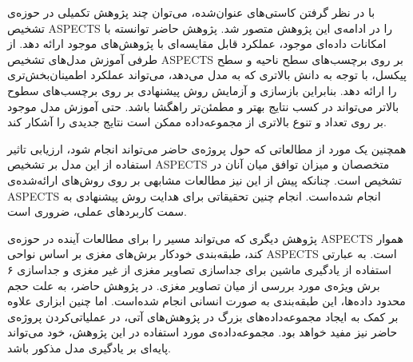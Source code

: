 
با در نظر گرفتن کاستی‌های عنوان‌شده، می‌توان چند پژوهش تکمیلی در حوزه‌ی تشخیص ASPECTS را در ادامه‌ی این پژوهش متصور شد.
پژوهش حاضر توانسته با امکانات داده‌ای موجود، عملکرد قابل مقایسه‌ای با پژوهش‌های موجود ارائه دهد.
از طرفی
آموزش مدل‌های تشخیص ASPECTS بر روی برچسب‌های سطح ناحیه و سطح پیکسل، با توجه به دانش بالاتری که به مدل می‌دهد، می‌تواند عملکرد اطمینان‌بخش‌تری را ارائه دهد.
بنابراین بازسازی و آزمایش روش پیشنهادی بر روی برچسب‌های سطوح بالاتر می‌تواند در کسب نتایج بهتر و مطمئن‌تر راهگشا باشد.
حتی آموزش مدل موجود بر روی تعداد و تنوع بالاتری از مجموعه‌داده ممکن است نتایج جدیدی را آشکار کند.

همچنین یک مورد از مطالعاتی که حول پروژه‌ی حاضر می‌تواند انجام شود، ارزیابی تاثیر استفاده از این مدل بر تشخیص ASPECTS متخصصان و 
میزان توافق میان آنان در تشخیص است.
چنانکه پیش از این نیز مطالعات مشابهی بر روی روش‌های ارائه‌شده‌ی ASPECTS انجام شده‌است.
انجام چنین تحقیقاتی برای هدایت روش پیشنهادی به سمت کاربرد‌های عملی، ضروری است.

پژوهش دیگری که می‌تواند مسیر را برای مطالعات آینده در حوزه‌ی ASPECTS هموار کند، 
طبقه‌بندی خودکار برش‌های مغزی بر اساس نواحی ASPECTS است.
به عبارتی استفاده از یادگیری ماشین برای جداسازی تصاویر مغزی از غیر مغزی و جداسازی ۶ برش ویژه‌ی مورد بررسی از میان تصاویر مغزی.
در پژوهش حاضر، به علت حجم محدود داد‌ه‌ها، این طبقه‌بندی به صورت انسانی انجام شده‌است.
اما چنین ابزاری علاوه بر 
کمک به ایجاد مجموعه‌داده‌های بزرگ در پژوهش‌های آتی، در عملیاتی‌کردن پروژه‌ی حاضر نیز مفید خواهد بود.
مجموعه‌داده‌ی مورد استفاده در این پژوهش، خود می‌تواند پایه‌ای بر یادگیری مدل مذکور باشد.
